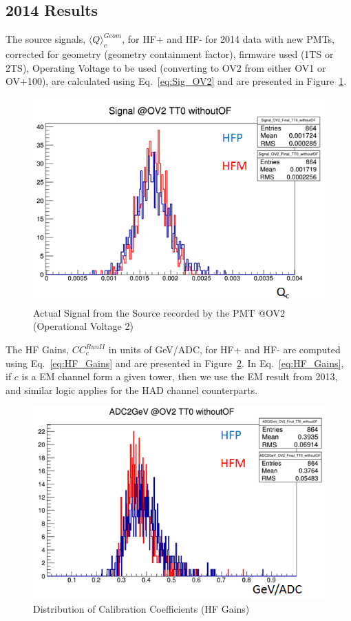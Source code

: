 \subsection{2014 Results}
The source signals, ${\langle{Q}\rangle}^{Geom}_{c}$, for HF+ and HF- for 2014 data with new PMTs, corrected for geometry (geometry containment factor), firmware used (1TS or 2TS), Operating Voltage to be used (converting to OV2 from either OV1 or OV+100), are calculated using Eq.~\ref{eq:Sig_OV2} and are presented in Figure~\ref{fig:Signal_@OV2_TT0_withoutOF_FORDN}.
\begin{figure}[!h]
	\begin{center}
		\includegraphics[width=.5\textwidth]{figures/ch_hfcalibration/Signal_@OV2_TT0_withoutOF_FORDN.png}
		\caption{Actual Signal from the Source recorded by the PMT @OV2 (Operational Voltage 2)}
		\label{fig:Signal_@OV2_TT0_withoutOF_FORDN}
	\end{center}
\end{figure}

The HF Gains, ${CC}^{Run II}_{c}$ in units of GeV/ADC, for HF+ and HF- are
computed using Eq.~\ref{eq:HF_Gains} and are presented in Figure~\ref{fig:ADC2GeV_OV2_TT0_withoutOF_FORDN}. In Eq.~\ref{eq:HF_Gains}, if $c$ is a EM channel form a given tower, then we use the EM result from 2013, and similar logic applies for the HAD channel
counterparts.
\begin{figure}[!h]
	\begin{center}
		\includegraphics[width=.5\textwidth]{figures/ch_hfcalibration/ADC2GeV_OV2_TT0_withoutOF_FORDN.png}
		\caption{Distribution of Calibration Coefficients (HF Gains)}
		\label{fig:ADC2GeV_OV2_TT0_withoutOF_FORDN}
	\end{center}
\end{figure}

